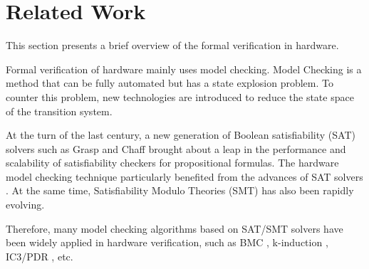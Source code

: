 \documentclass[conference]{IEEEtran}
\theoremstyle{definition}
\begin{document}


\section{Related Work}
This section presents a brief overview of the formal verification in hardware.

Formal verification of hardware mainly uses model checking.
Model Checking is a method that can be fully automated but has a state explosion problem. To counter this problem, new technologies are introduced to reduce the state space of the transition system.

At the turn of the last century, a new generation of Boolean satisfiability (SAT) solvers such as Grasp \cite{SilvaS96} and Chaff \cite{MoskewiczMZZM01} brought about a leap in the performance and scalability of satisfiability checkers for propositional formulas. The hardware model checking technique particularly benefited from the advances of SAT solvers \cite{vizel2015boolean}. At the same time, Satisfiability Modulo Theories (SMT) \cite{barrett2018satisfiability} has also been rapidly evolving. 

Therefore, many model checking algorithms based on SAT/SMT solvers have been widely applied in hardware verification, such as BMC \cite{BiereCCZ99}, k-induction \cite{tinelli2012smt}, IC3/PDR \cite{Bradley11}, etc.
\end{document}
